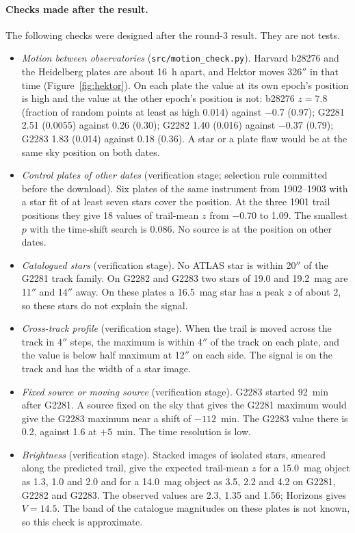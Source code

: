 \documentclass[11pt]{article}
\newcommand{\as}{$''$}
\begin{document}
\paragraph{Checks made after the result.} The following checks were designed after the round-3 result. They are not tests.
\begin{itemize}
\item \emph{Motion between observatories} (\texttt{src/motion\_check.py}). Harvard b28276 and the Heidelberg plates are about 16~h apart, and Hektor moves 326\as{} in that time (Figure~\ref{fig:hektor}). On each plate the value at its own epoch's position is high and the value at the other epoch's position is not: b28276 $z=7.8$ (fraction of random points at least as high 0.014) against $-0.7$ (0.97); G2281 2.51 (0.0055) against 0.26 (0.30); G2282 1.40 (0.016) against $-0.37$ (0.79); G2283 1.83 (0.014) against 0.18 (0.36). A star or a plate flaw would be at the same sky position on both dates.
\item \emph{Control plates of other dates} (verification stage; selection rule committed before the download). Six plates of the same instrument from 1902--1903 with a star fit of at least seven stars cover the position. At the three 1901 trail positions they give 18 values of trail-mean $z$ from $-0.70$ to 1.09. The smallest $p$ with the time-shift search is 0.086. No source is at the position on other dates.
\item \emph{Catalogued stars} (verification stage). No ATLAS star is within 20\as{} of the G2281 track family. On G2282 and G2283 two stars of 19.0 and 19.2~mag are 11\as{} and 14\as{} away. On these plates a 16.5~mag star has a peak $z$ of about 2, so these stars do not explain the signal.
\item \emph{Cross-track profile} (verification stage). When the trail is moved across the track in 4\as{} steps, the maximum is within 4\as{} of the track on each plate, and the value is below half maximum at 12\as{} on each side. The signal is on the track and has the width of a star image.
\item \emph{Fixed source or moving source} (verification stage). G2283 started 92~min after G2281. A source fixed on the sky that gives the G2281 maximum would give the G2283 maximum near a shift of $-112$~min. The G2283 value there is 0.2, against 1.6 at $+5$~min. The time resolution is low.
\item \emph{Brightness} (verification stage). Stacked images of isolated stars, smeared along the predicted trail, give the expected trail-mean $z$ for a 15.0~mag object as 1.3, 1.0 and 2.0 and for a 14.0~mag object as 3.5, 2.2 and 4.2 on G2281, G2282 and G2283. The observed values are 2.3, 1.35 and 1.56; Horizons gives $V=14.5$. The band of the catalogue magnitudes on these plates is not known, so this check is approximate.
\end{itemize}
\end{document}
